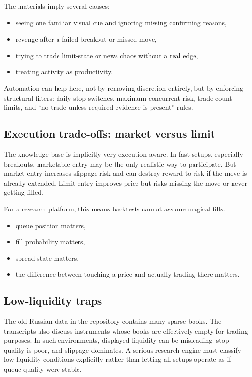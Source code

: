 The materials imply several causes:

\begin{itemize}[leftmargin=1.4em]
  \item seeing one familiar visual cue and ignoring missing confirming reasons,
  \item revenge after a failed breakout or missed move,
  \item trying to trade limit-state or news chaos without a real edge,
  \item treating activity as productivity.
\end{itemize}

Automation can help here, not by removing discretion entirely, but by enforcing structural
filters: daily stop switches, maximum concurrent risk, trade-count limits, and ``no trade unless
required evidence is present'' rules.

\subsection{Execution trade-offs: market versus limit}

The knowledge base is implicitly very execution-aware. In fast setups, especially breakouts,
marketable entry may be the only realistic way to participate. But market entry increases
slippage risk and can destroy reward-to-risk if the move is already extended. Limit entry
improves price but risks missing the move or never getting filled.

For a research platform, this means backtests cannot assume magical fills:

\begin{itemize}[leftmargin=1.4em]
  \item queue position matters,
  \item fill probability matters,
  \item spread state matters,
  \item the difference between touching a price and actually trading there matters.
\end{itemize}

\subsection{Low-liquidity traps}

The old Russian data in the repository contains many sparse books. The transcripts also discuss
instruments whose books are effectively empty for trading purposes. In such environments,
displayed liquidity can be misleading, stop quality is poor, and slippage dominates. A serious
research engine must classify low-liquidity conditions explicitly rather than letting all
setups operate as if queue quality were stable.


